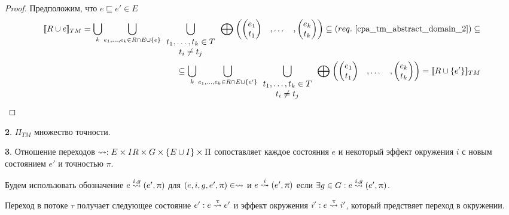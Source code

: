 \begin{proof}
Предположим, что $e \sqsubseteq e' \in E$
\begin{align}
[\![ R \cup e ]\!]_{TM} = \bigcup_{k}{\bigcup_{
e_1,\dots,e_k \in R \cap E \cup \{e\}}{
\bigcup_{
\begin{array}{c}
t_1,\dots,t_k \in T \\
t_i \neq t_j
\end{array}
} {
\mathrel{\bigoplus}
\begin{pmatrix}
\begin{pmatrix}
e_1 \\
t_1 
\end{pmatrix}&,
\dots& ,
\begin{pmatrix}
e_k \\
t_k 
\end{pmatrix}
\end{pmatrix} 
}
}
} \subseteq (req.~\ref{cpa_tm_abstract_domain_2}) \subseteq \nonumber \\
\subseteq \bigcup_{k}{\bigcup_{
e_1,\dots,e_k \in R \cap E \cup \{e'\}}{
\bigcup_{
\begin{array}{c}
t_1,\dots,t_k \in T \\
t_i \neq t_j
\end{array}
} {
\mathrel{\bigoplus}
\begin{pmatrix}
\begin{pmatrix}
e_1 \\
t_1 
\end{pmatrix}&,
\dots& ,
\begin{pmatrix}
e_k \\
t_k 
\end{pmatrix}
\end{pmatrix} 
}
}
} = [\![ R \cup \{e'\} ]\!]_{TM} \nonumber
\end{align}
\end{proof}

{\textbf 2.}
$\Pi_{TM}$ множество точности.

{\textbf 3.}
Отношение переходов
$\leadsto: E\times IR \times G \times \{E\cup I\} \times \Pi$
сопоставляет каждое состояния $e$ и некоторый эффект окружения $i$ с новым состоянием $e'$ и точностью $\pi$. 

Будем использовать обозначение $e \stackrel{i, g}{\leadsto} (e', \uppi)$ для $(e, i, g, e', \uppi) \in \leadsto$
и $e \stackrel{i}{\leadsto} (e', \uppi)$ если $\exists g \in G: e \stackrel{i, g}{\leadsto} (e', \uppi)$.

Переход в потоке $\tau$ получает следующее состояние $e': e \stackrel{\uptau}{\leadsto} e'$ и эффект окружения $i': e \stackrel{\uptau}{\leadsto} i'$, который предствяет переход в окружении.

